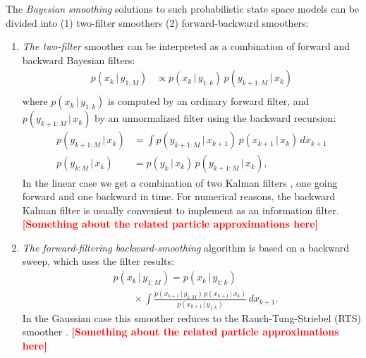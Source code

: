 \documentclass[twocolumn]{autart}    %
\newcommand{\comment}[1]{\textcolor{red}{\textbf{[#1]}}}
\begin{document}
The {\em Bayesian smoothing} solutions to such probabilistic state
space models can be divided into (1) two-filter smoothers (2)
forward-backward smoothers:
%
\begin{enumerate}
\item {\em The two-filter} smoother \cite{Lee:1964,Kitagawa:1994} can be
  interpreted as a combination of forward and backward Bayesian filters:
%
\begin{equation}
\begin{split}
  p(x_k \,|\, y_{1:M})
  &\propto
  p(x_k \,|\, y_{1:k}) \, p(y_{k+1:M} \,|\, x_k) \\
\end{split}
\end{equation}
where $p(x_k \,|\, y_{1:k})$ is computed by an ordinary forward filter, and
$p(y_{k+1:M} \,|\, x_k)$ by an unnormalized filter using the backward recursion:
%
\begin{equation}
\begin{split}
  p(y_{k+1:M} \,|\, x_k) 
  &= \int p(y_{k+1:M} \,|\, x_{k+1}) \, p(x_{k+1} \,|\, x_k) \,
          dx_{k+1} \\
  p(y_{k:M} \,|\, x_k) 
  &= p(y_k \,|\, x_k) \, p(y_{k+1:M} \,|\, x_k),
\end{split}
\label{eq:tfsmooth}
\end{equation}
%
In the linear case we get a combination of two Kalman filters
\cite{Fraser+Potter:1969}, one going forward and one backward in time.
For numerical reasons, the backward Kalman filter is usually
convenient to implement as an information filter. \comment{Something
about the related particle approximations here}

\item {\em The forward-filtering backward-smoothing} algorithm
  \cite{Kitagawa:1987} is based on a backward sweep, which uses the
  filter results:
%
\begin{equation}
\begin{split}
 &p(x_{k} \,|\, y_{1:M})
  = p(x_{k}\,|\,y_{1:k}) \\
 &\qquad \times \int 
    \frac{p(x_{k+1} \,|\, y_{1:M}) \, p(x_{k+1}\,|\,x_{k})}
         {p(x_{k+1}\,|\,y_{1:k})} \, dx_{k+1}.
\end{split}
\label{eq:fbsmooth}
\end{equation}
%
In the Gaussian case this smoother reduces to the Rauch-Tung-Striebel
(RTS) smoother \cite{Rauch+Tung+Striebel:1965}. \comment{Something
about the related particle approximations here}
\end{enumerate}
\end{document}
